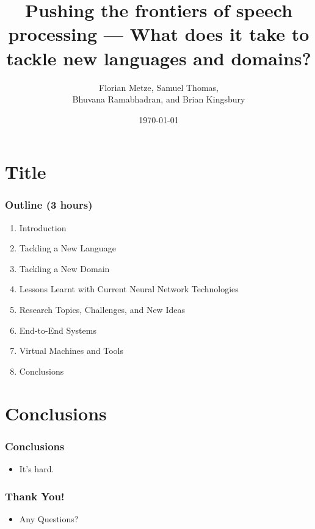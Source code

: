 \documentclass[12pt,xcolor=dvipsnames]{beamer}
\author{Florian Metze, Samuel Thomas, \\
  Bhuvana Ramabhadran, and Brian Kingsbury}
\title{{\color{Maroon} Pushing the frontiers of speech processing --- What does it take to tackle new languages and domains?}}
\institute{Carnegie Mellon University and IBM}
\date{\today}
\begin{document}
\section{Title}

\begin{frame}
  \titlepage
\end{frame}



\begin{frame}
  \frametitle{Outline (3 hours)}
  \begin{enumerate}
  \item Introduction
  \item Tackling a New Language
  \item Tackling a New Domain
  \item Lessons Learnt with Current Neural Network Technologies
  \item Research Topics, Challenges, and New Ideas
  \item End-to-End Systems
  \item Virtual Machines and Tools
  \item Conclusions
  \end{enumerate}
\end{frame}









\section{Conclusions}

\begin{frame}
  \frametitle{Conclusions}
  \begin{itemize}
  \item It's hard.
  \end{itemize}
\end{frame}

\begin{frame}
  \frametitle{Thank You!}
  \begin{itemize}
  \item Any Questions?
  \end{itemize}
\end{frame}


\end{document}
